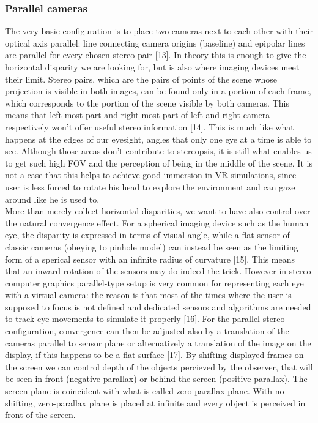 \subsubsection{Parallel cameras}
The very basic configuration is to place two cameras next to each other with their optical axis parallel: line connecting camera origins (baseline) and epipolar lines are parallel for every chosen stereo pair [13]. In theory this is enough to give the horizontal disparity we are looking for, but is also where imaging devices meet their limit. Stereo pairs, which are the pairs of points of the scene whose projection is visible in both images, can be found only in a portion of each frame, which corresponds to the portion of the scene visible by both cameras. This means that left-most part and right-most part of left and right camera respectively won’t offer useful stereo information [14]. This is much like what happens at the edges of our eyesight, angles that only one eye at a time is able to see. Although those areas don’t contribute to stereopsis, it is still what enables us to get such high FOV and the perception of being in the middle of the scene. It is not a case that this helps to achieve good immersion in VR simulations, since user is less forced to rotate his head to explore the environment and can gaze around like he is used to.\\
More than merely collect horizontal disparities, we want to have also control over the natural convergence effect. For a spherical imaging device such as the human eye, the disparity is expressed in terms of visual angle, while a flat sensor of classic cameras (obeying to pinhole model) can instead be seen as the limiting form of a sperical sensor with an infinite radius of curvature [15]. This means that an inward rotation of the sensors may do indeed the trick. However in stereo computer graphics parallel-type setup is very common for representing each eye with a virtual camera: the reason is that most of the times where the user is supposed to focus is not defined and dedicated sensors and algorithms are needed to track eye movements to simulate it properly [16]. For the parallel stereo configuration, convergence can then be adjusted also by a translation of the cameras parallel to sensor plane or alternatively a translation of the image on the display, if this happens to be a flat surface [17]. By shifting displayed frames on the screen we can control depth of the objects percieved by the observer, that will be seen in front (negative parallax) or behind the screen (positive parallax). The screen plane is coincident with what is called zero-parallax plane. With no shifting, zero-parallax plane is placed at infinite and every object is perceived in front of the screen.\\
